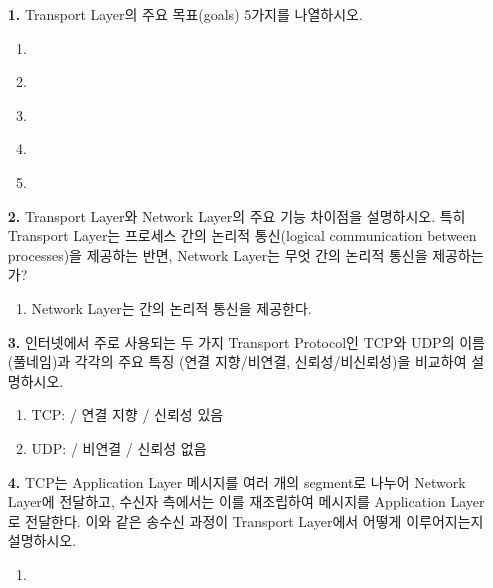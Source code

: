 \documentclass[a4paper, 10pt]{article}
\newcommand{\ansline}[1]{\underline{\hspace{#1}}}
\newcommand{\sectionbox}[1]{
  \vspace{0.5em}
  \noindent\fbox{\textbf{#1}}
  \vspace{0.5em}
}
\begin{document}
\begin{enumerate}[itemsep=2em, leftmargin=2em, label={}]

\item[] \sectionbox{I. 용어 및 기본 개념 (8문제)}

\item[\textbf{1.}] Transport Layer의 주요 목표(goals) 5가지를 나열하시오.
\begin{enumerate}[label=\alph*., itemsep=0.3em, leftmargin=1.5em]
    \item \ansline{5cm}
    \item \ansline{5cm}
    \item \ansline{5cm}
    \item \ansline{5cm}
    \item \ansline{5cm}
\end{enumerate}

\item[\textbf{2.}] Transport Layer와 Network Layer의 주요 기능 차이점을 설명하시오. 특히 Transport Layer는 프로세스 간의 논리적 통신(logical communication between processes)을 제공하는 반면, Network Layer는 무엇 간의 논리적 통신을 제공하는가?
\begin{enumerate}[label=\alph*., itemsep=0.3em, leftmargin=1.5em]
    \item Network Layer는 \ansline{5cm} 간의 논리적 통신을 제공한다.
\end{enumerate}

\item[\textbf{3.}] 인터넷에서 주로 사용되는 두 가지 Transport Protocol인 TCP와 UDP의 이름(풀네임)과 각각의 주요 특징 (연결 지향/비연결, 신뢰성/비신뢰성)을 비교하여 설명하시오.
\begin{enumerate}[label=\alph*., itemsep=0.3em, leftmargin=1.5em]
    \item TCP: \ansline{5cm} / 연결 지향 / 신뢰성 있음
    \item UDP: \ansline{5cm} / 비연결 / 신뢰성 없음
\end{enumerate}

\item[\textbf{4.}] TCP는 Application Layer 메시지를 여러 개의 segment로 나누어 Network Layer에 전달하고, 수신자 측에서는 이를 재조립하여 메시지를 Application Layer로 전달한다. 이와 같은 송수신 과정이 Transport Layer에서 어떻게 이루어지는지 설명하시오.
\begin{enumerate}[label={}, itemsep=0.3em, leftmargin=1.5em]
    \item \ansline{12cm}
\end{enumerate}


\end{enumerate}
\end{document}
